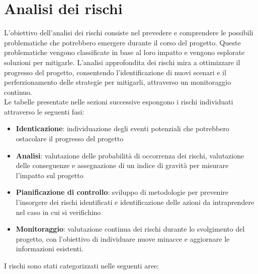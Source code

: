 \section{Analisi dei rischi}
L'obiettivo dell'analisi dei rischi consiste nel prevedere e comprendere
le possibili problematiche che potrebbero emergere durante il corso del progetto.
Queste problematiche vengono classificate in base al loro impatto e vengono
esplorate soluzioni per mitigarle. L'analisi approfondita dei rischi mira a ottimizzare
il progresso del progetto, consentendo l'identificazione di nuovi scenari e il perferzionamento
delle strategie per mitigarli, attraverso un monitoraggio continuo. \\
Le tabelle presentate nelle sezioni successive espongono i rischi individuati attraverso
le seguenti fasi:
\begin{itemize}
    \item \textbf{Identicazione}: individuazione degli eventi potenziali che potrebbero ostacolare il progresso del progetto
    \item \textbf{Analisi}: valutazione delle probabilità di occorrenza dei rischi, valutazione delle conseguenze
            e assegnazione di un indice di gravità per misurare l'impatto sul progetto
    \item \textbf{Pianificazione di controllo}: sviluppo di metodologie per prevenire l'insorgere
            dei rischi identificati e identificazione delle azioni da intraprendere nel caso in cui si verifichino
    \item \textbf{Monitoraggio}: valutazione continua dei rischi durante lo svolgimento del progetto, con l'obiettivo 
            di individuare nuove minacce e aggiornare le informazioni esistenti.
\end{itemize}
I rischi sono stati categorizzati nelle seguenti aree:
